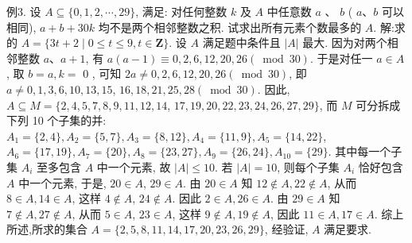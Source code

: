 例3. 设 $A \subseteq\{0,1,2, \cdots, 29\}$, 满足: 对任何整数 $k$ 及 $A$ 中任意数 $a$ 、 $b$ ( $a 、 b$ 可以相同), $a+b+30 k$ 均不是两个相邻整数之积.
试求出所有元素个数最多的 $A$.
解:求的 $A=\{3 t+2 \mid 0 \leqslant t \leqslant 9, t \in \mathbf{Z}\}$.
设 $A$ 满足题中条件且 $|A|$ 最大.
因为对两个相邻整数 $a 、 a+1$, 有 $a(a-1) \equiv 0,2,6,12,20,26(\bmod 30)$. 于是对任一 $a \in A$, 取 $b=a, k=$ 0 , 可知 $2 a \neq 0,2,6,12,20,26(\bmod 30)$, 即 $a \neq 0,1,3,6,10,13,15$, $16,18,21,25,28(\bmod 30)$. 因此, $A \subseteq M=\{2,4,5,7,8,9,11,12,14$, $17,19,20,22,23,24,26,27 , 29\}$, 而 $M$ 可分拆成下列 10 个子集的并: $A_1=\{2,4\}, A_2=\{5,7\}, A_3=\{8,12\}, A_4=\{11,9\}, A_5=\{14,22\}$, $A_6=\{17,19\}, A_7=\{20\}, A_8=\{23,27\}, A_9=\{26,24\}, A_{10}=\{29\}$. 其中每一个子集 $A_i$ 至多包含 $A$ 中一个元素, 故 $|A| \leqslant 10$.
若 $|A|=10$, 则每个子集 $A_i$ 恰好包含 $A$ 中一个元素, 于是, $20 \in A$, $29 \in A$. 由 $20 \in A$ 知 $12 \notin A, 22 \notin A$, 从而 $8 \in A, 14 \in A$, 这样 $4 \notin A$, $24 \notin A$. 因此 $2 \in A, 26 \in A$. 由 $29 \in A$ 知 $7 \notin A, 27 \notin A$, 从而 $5 \in A$, $23 \in A$, 这样 $9 \notin A, 19 \notin A$, 因此 $11 \in A, 17 \in A$.
综上所述,所求的集合 $A=\{2,5,8,11,14,17,20,23,26,29\}$, 经验证, $A$ 满足要求.



